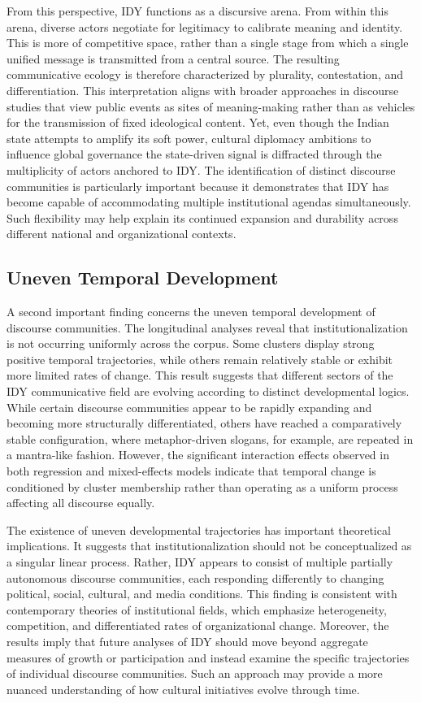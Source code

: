 \documentclass[11pt]{article}
\begin{document}
{From this perspective, IDY functions as a discursive arena. From within this arena, diverse actors negotiate for legitimacy to calibrate meaning and identity. This is more of competitive space, rather than a single stage from which a single unified message is transmitted from a central source. The resulting communicative ecology is therefore characterized by plurality, contestation, and differentiation. This interpretation aligns with broader approaches in discourse studies that view public events as sites of meaning-making rather than as vehicles for the transmission of fixed ideological content. Yet, even though the Indian state attempts to amplify its soft power, cultural diplomacy ambitions to influence global governance the state-driven signal is diffracted through the multiplicity of actors anchored to IDY. The identification of distinct discourse communities is particularly important because it demonstrates that IDY has become capable of accommodating multiple institutional agendas simultaneously. Such flexibility may help explain its continued expansion and durability across different national and organizational contexts.


\subsection{Uneven Temporal Development}

A second important finding concerns the uneven temporal development of discourse communities. The longitudinal analyses reveal that institutionalization is not occurring uniformly across the corpus. Some clusters display strong positive temporal trajectories, while others remain relatively stable or exhibit more limited rates of change. This result suggests that different sectors of the IDY communicative field are evolving according to distinct developmental logics. While certain discourse communities appear to be rapidly expanding and becoming more structurally differentiated, others have reached a comparatively stable configuration, where metaphor-driven slogans, for example, are repeated in a mantra-like fashion. However, the significant interaction effects observed in both regression and mixed-effects models indicate that temporal change is conditioned by cluster membership rather than operating as a uniform process affecting all discourse equally.

The existence of uneven developmental trajectories has important theoretical implications. It suggests that institutionalization should not be conceptualized as a singular linear process. Rather, IDY appears to consist of multiple partially autonomous discourse communities, each responding differently to changing political, social, cultural, and media conditions. This finding is consistent with contemporary theories of institutional fields, which emphasize heterogeneity, competition, and differentiated rates of organizational change. Moreover, the results imply that future analyses of IDY should move beyond aggregate measures of growth or participation and instead examine the specific trajectories of individual discourse communities. Such an approach may provide a more nuanced understanding of how cultural initiatives evolve through time.


}
\end{document}
